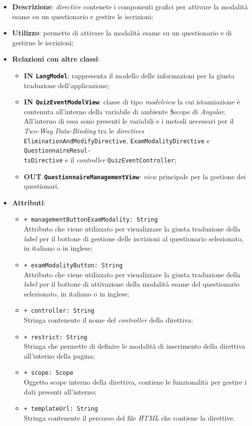 \begin{itemize}
	\item \textbf{Descrizione}: \textit{directive} contenete i componenti grafici per attivare la modalità esame su un questionario e gestire le iscrizioni;
	\item \textbf{Utilizzo}: permette di attivare la modalità esame su un questionario e di gestirne le iscrizioni;
	\item \textbf{Relazioni con altre classi}:
	\begin{itemize}
		\item \textbf{IN \texttt{LangModel}}: rappresenta il modello delle informazioni per la giusta traduzione dell'applicazione;
		\item \textbf{IN \texttt{QuizEventModelView}}: classe di tipo \textit{modelview} la cui istanziazione è contenuta all'interno della variabile di ambiente \$scope di \textit{Angular}. All'interno di essa sono presenti le variabili e i metodi necessari per il \textit{Two-Way Data-Binding} tra le \textit{directives} \texttt{EliminationAndModifyDirective}, \texttt{ExamModalityDirective} e \texttt{QuestionnaireResul-\\tsDirective} e il \textit{controller} \texttt{QuizEventController};
		\item \textbf{OUT \texttt{QuestionnaireManagementView}}: \textit{view} principale per la gestione dei questionari.
	\end{itemize}
		\item \textbf{Attributi}:
		\begin{itemize}
			\item \texttt{+ managementButtonExamModality: String} \\ Attributo che viene utilizzato per visualizzare la giusta traduzione della \textit{label} per il bottone di gestione delle iscrizioni al questionario selezionato, in italiano o in inglese; 
			\item \texttt{+ examModalityButton: String} \\ Attributo che viene utilizzato per visualizzare la giusta traduzione della \textit{label} per il bottone di attivazione della modalità esame del questionario selezionato, in italiano o in inglese;
			\item \texttt{+ controller: String} \\ Stringa contenente il nome del \textit{controller} della direttiva;
			\item \texttt{+ restrict: String} \\ Stringa che permette di definire le modalità di inserimento della direttiva all'interno della pagina;
			\item \texttt{+ scope: Scope} \\ Oggetto scope interno della direttiva, contiene le funzionalità per gestire i dati presenti all'interno;
			\item \texttt{+ templateUrl: String} \\ Stringa contenente il percorso del file \textit{HTML} che contiene la direttive.
		\end{itemize}
\end{itemize}